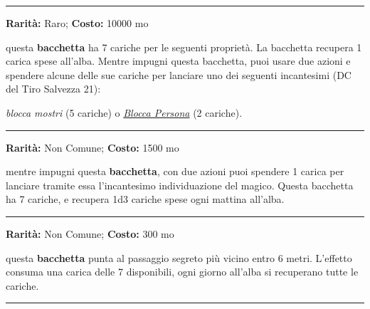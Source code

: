 \begin{multicols}{2}
\smallskip\noindent\rule{\linewidth}{2pt}  \hypertarget{BacchettadelVincolo}{}\smallskip{}\noindent\label{BacchettadelVincolo}

\textbf{Rarità:} Raro; \textbf{Costo:} 10000 mo

questa \textbf{bacchetta} ha 7 cariche per le seguenti proprietà. La bacchetta recupera 1 carica spese all'alba. Mentre impugni questa bacchetta, puoi usare due azioni e spendere alcune delle sue cariche per lanciare uno dei seguenti incantesimi (DC del Tiro Salvezza 21):

\emph{blocca mostri} (5 cariche) o \emph{\hyperlink{Blocca Persona}{Blocca Persona}} (2 cariche).

\smallskip\noindent\rule{\linewidth}{2pt}  \hypertarget{Bacchettadell'IndividuazionedelMagico}{}\smallskip{}\noindent\label{Bacchettadell'IndividuazionedelMagico}

\textbf{Rarità:} Non Comune; \textbf{Costo:} 1500 mo

mentre impugni questa \textbf{bacchetta}, con due azioni puoi spendere 1 carica per lanciare tramite essa l'incantesimo individuazione del magico. Questa bacchetta ha 7 cariche, e recupera 1d3 cariche spese ogni mattina all'alba.

\smallskip\noindent\rule{\linewidth}{2pt}  \hypertarget{Bacchettadell'Individuazionedelleportesegrete}{}\smallskip{}\noindent\label{Bacchettadell'Individuazionedelleportesegrete}

\textbf{Rarità:} Non Comune; \textbf{Costo:} 300 mo

questa \textbf{bacchetta} punta al passaggio segreto più vicino entro 6 metri. L'effetto consuma una carica delle 7 disponibili, ogni giorno all'alba si recuperano tutte le cariche.

\smallskip\noindent\rule{\linewidth}{2pt}  \hypertarget{BacchettadellaFugaAssistita}{}\smallskip{}\noindent\label{BacchettadellaFugaAssistita}


\end{multicols}
